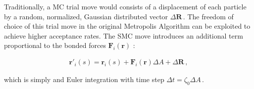\documentclass[bachelor,       %
               oneside,        %
               BCOR10mm,       %
               ngerman, english %
               ]{GAUBM}
\begin{document}
Traditionally, a \ac{MC} trial move would consists of a displacement of each particle by a random, normalized, Gaussian distributed vector $\Delta\mathbf R\,.$ The freedom of choice of this trial move in the original Metropolis Algorithm \cite{metropolis} can be exploited to achieve higher acceptance rates. The \ac{SMC} move introduces an additional term proportional to the bonded forces $\mathbf{F}_i(\mathbf r)$ \cite{smc, mueller_deltat}:

\begin{align}
    \mathbf{r'}_i(s)=\mathbf{r}_i(s)+\mathbf{F}_i(\mathbf r)\Delta A+\Delta\mathbf R\,,
\end{align}

which is simply and Euler integration with time step $\Delta t=\zeta_0\Delta A\,.$







\end{document}

